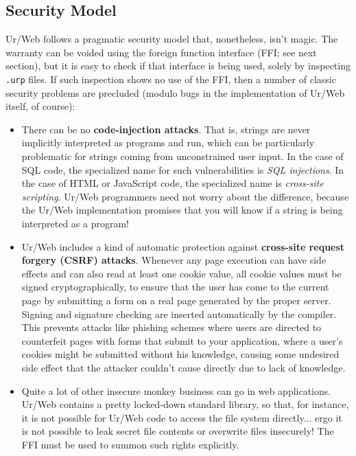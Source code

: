 \documentclass{article}
\begin{document}
\subsection{Security Model}

Ur/Web follows a pragmatic security model that, nonetheless, isn't magic.  The warranty can be voided using the foreign function interface (FFI; see next section), but it is easy to check if that interface is being used, solely by inspecting \texttt{.urp} files.  If such inspection shows no use of the FFI, then a number of classic security problems are precluded (modulo bugs in the implementation of Ur/Web itself, of course):
\begin{itemize}
\item There can be no \textbf{code-injection attacks}.  That is, strings are never implicitly interpreted as programs and run, which can be particularly problematic for strings coming from unconstrained user input.  In the case of SQL code, the specialized name for such vulnerabilities is \emph{SQL injections}.  In the case of HTML or JavaScript code, the specialized name is \emph{cross-site scripting}.  Ur/Web programmers need not worry about the difference, because the Ur/Web implementation promises that you will know if a string is being interpreted as a program!
\item Ur/Web includes a kind of automatic protection against \textbf{cross-site request forgery (CSRF) attacks}.  Whenever any page execution can have side effects and can also read at least one cookie value, all cookie values must be signed cryptographically, to ensure that the user has come to the current page by submitting a form on a real page generated by the proper server.  Signing and signature checking are inserted automatically by the compiler.  This prevents attacks like phishing schemes where users are directed to counterfeit pages with forms that submit to your application, where a user's cookies might be submitted without his knowledge, causing some undesired side effect that the attacker couldn't cause directly due to lack of knowledge.
\item Quite a lot of other insecure monkey business can go in web applications.  Ur/Web contains a pretty locked-down standard library, so that, for instance, it is not possible for Ur/Web code to access the file system directly... ergo it is not possible to leak secret file contents or overwrite files insecurely!  The FFI must be used to summon such rights explicitly.
\end{itemize}
\end{document}
